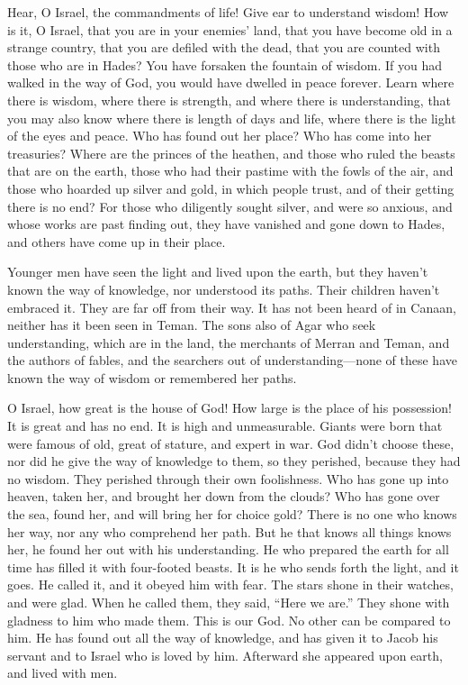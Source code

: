  Hear, O Israel, the commandments of life! Give ear to
understand wisdom!  How is it, O Israel, that you are in
your enemies' land, that you have become old in a strange country, that
you are defiled with the dead,  that you are counted with
those who are in Hades?  You have forsaken the fountain of
wisdom.  If you had walked in the way of God, you would
have dwelled in peace forever.  Learn where there is
wisdom, where there is strength, and where there is understanding, that
you may also know where there is length of days and life, where there is
the light of the eyes and peace.  Who has found out her
place? Who has come into her treasuries?  Where are the
princes of the heathen, and those who ruled the beasts that are on the
earth,  those who had their pastime with the fowls of the
air, and those who hoarded up silver and gold, in which people trust,
and of their getting there is no end?  For those who
diligently sought silver, and were so anxious, and whose works are past
finding out,  they have vanished and gone down to Hades,
and others have come up in their place.

 Younger men have seen the light and lived upon the earth,
but they haven't known the way of knowledge,  nor
understood its paths. Their children haven't embraced it. They are far
off from their way.  It has not been heard of in Canaan,
neither has it been seen in Teman.  The sons also of Agar
who seek understanding, which are in the land, the merchants of Merran
and Teman, and the authors of fables, and the searchers out of
understanding---none of these have known the way of wisdom or remembered
her paths.

 O Israel, how great is the house of God! How large is the
place of his possession!  It is great and has no end. It is
high and unmeasurable.  Giants were born that were famous
of old, great of stature, and expert in war.  God didn't
choose these, nor did he give the way of knowledge to them,
 so they perished, because they had no wisdom. They
perished through their own foolishness.  Who has gone up
into heaven, taken her, and brought her down from the clouds?
 Who has gone over the sea, found her, and will bring her
for choice gold?  There is no one who knows her way, nor
any who comprehend her path.  But he that knows all things
knows her, he found her out with his understanding. He who prepared the
earth for all time has filled it with four-footed beasts. 
It is he who sends forth the light, and it goes. He called it, and it
obeyed him with fear.  The stars shone in their watches,
and were glad. When he called them, they said, ``Here we are.'' They
shone with gladness to him who made them.  This is our God.
No other can be compared to him.  He has found out all the
way of knowledge, and has given it to Jacob his servant and to Israel
who is loved by him.  Afterward she appeared upon earth,
and lived with men.

